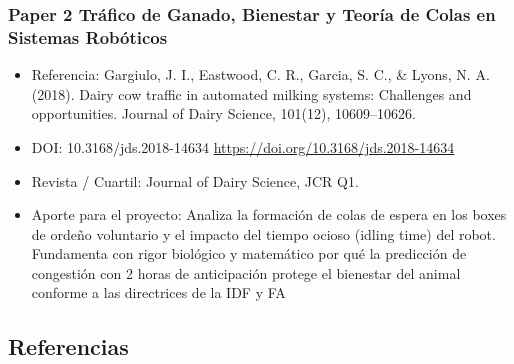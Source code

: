 \subsubsection*{Paper 2 Tráfico de Ganado, Bienestar y Teoría de Colas en Sistemas Robóticos}

\begin{itemize}
  \item Referencia: Gargiulo, J. I., Eastwood, C. R., Garcia, S. C., \& Lyons, N. A. (2018). Dairy cow traffic in automated milking systems: Challenges and opportunities. Journal of Dairy Science, 101(12), 10609–10626.
  \item DOI: 10.3168/jds.2018-14634 \url{https://doi.org/10.3168/jds.2018-14634}
  \item Revista / Cuartil: Journal of Dairy Science, JCR Q1.
  \item Aporte para el proyecto: Analiza la formación de colas de espera en los boxes de ordeño voluntario y el impacto del tiempo ocioso (idling time) del robot. Fundamenta con rigor biológico y matemático por qué la predicción de congestión con 2 horas de anticipación protege el bienestar del animal conforme a las directrices de la IDF y FA
\end{itemize}

\subsection*{Referencias}

